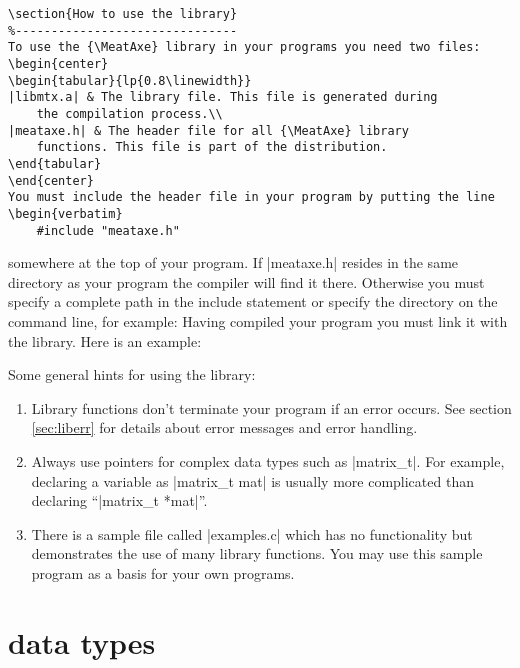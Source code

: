 {\begin{verbatim}
\section{How to use the library}
%-------------------------------
To use the {\MeatAxe} library in your programs you need two files:
\begin{center}
\begin{tabular}{lp{0.8\linewidth}}
|libmtx.a| & The library file. This file is generated during
	the compilation process.\\
|meataxe.h| & The header file for all {\MeatAxe} library
	functions. This file is part of the distribution.
\end{tabular}
\end{center}
You must include the header file in your program by putting the line
\begin{verbatim}
    #include "meataxe.h"
\end{verbatim}
somewhere at the top of your program. If |meataxe.h| resides in
the same directory as your program the compiler will find it there.
Otherwise you must specify a complete path in the include statement
or specify the directory on the command line, for example:
Having compiled your program you must link it with the
{\MeatAxe} library. Here is an example:

\medskip\noindent
Some general hints for using the library:
\begin{enumerate}
\item
    Library functions don't terminate your program if an error
    occurs. See section \ref{sec:liberr} for details about
    error messages and error handling.
\item
    Always use pointers for complex data types such as |matrix_t|.
    For example, declaring a variable as |matrix_t mat| is usually
    more complicated than declaring ``|matrix_t *mat|''.
\item
    There is a sample file called |examples.c| which has no
    functionality but demonstrates the use of many library functions.
    You may use this sample program as a basis for your own programs.
\end{enumerate}



\section{{\MeatAxe} data types}\label{sec:intdata}

}
